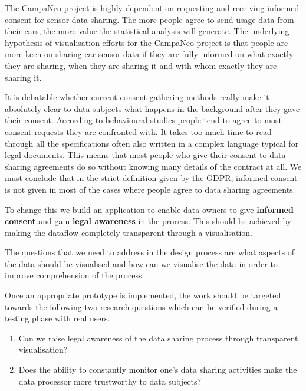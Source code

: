 
The CampaNeo project is highly dependent on requesting and receiving  informed consent for sensor data sharing. 
The more people agree to send usage data from their cars, the more value the statistical analysis will generate.
The underlying hypothesis of visualisation efforts for the CampaNeo project is  that people are more keen on sharing car sensor data if they are fully informed on what exactly they are sharing, when they are sharing it and with whom exactly they are sharing it.

It is debatable whether current consent gathering methods really make it absolutely clear to data subjects what happens in the background after they gave their consent. According to behavioural studies people tend to agree to most consent requests they are confronted with.\cite{Borgesisus_informed_consent_2015}
It takes too much time to read through all the specifications often also written in a complex language typical for legal documents.
This means that most people who give their consent to data sharing agreements do so without knowing many details of the contract at all. We must conclude that in the strict definition given by the GDPR, informed consent is not given in most of the cases where people agree to data sharing agreements.

To change this we build an application to enable data owners to give \textbf{informed consent} and gain \textbf{legal awareness} in the process. This should be achieved by making the dataflow completely transparent through a visualisation.

The questions that we need to address in the design process are what aspects of the data should be visualised and how can we visualise the data in order to improve comprehension of the process.

Once an appropriate prototype is implemented, the work should be targeted towards the following two research questions which can be verified during a testing phase with real users.

\begin{enumerate}
    \item Can we raise legal awareness of the data sharing process through transparent visualisation?
    \item Does the ability to constantly monitor one's data sharing activities make the data processor more trustworthy to data subjects?
\end{enumerate}


